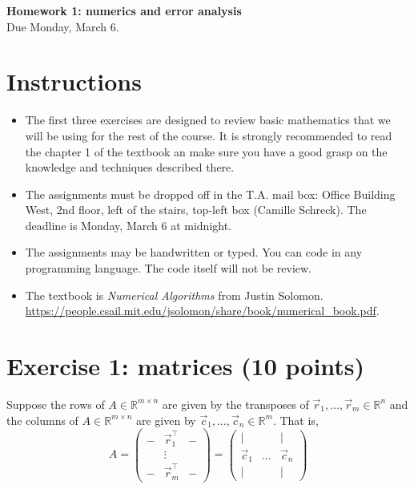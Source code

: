 

\lstset{
  language=Algo,
  basicstyle=\sffamily,
  columns=fullflexible,
  mathescape
}

\begin{center}
{\large\textbf{Homework 1: numerics and error analysis}}\\
Due Monday, March 6.
\end{center}

\noindent\makebox[\linewidth]{\rule{\linewidth}{0.6pt}}
 
\section{Instructions}

\begin{itemize}
\item The first three exercises are designed to review basic mathematics that we will be using for the rest of the course. It is strongly recommended to read the chapter 1 of the textbook an make sure you have a good grasp on the knowledge and techniques described there.
\item The assignments must be dropped off in the T.A. mail box: Office Building West, 2nd floor, left of the stairs, top-left box (Camille Schreck). The deadline is Monday, March 6 at midnight. 
\item The assignments may be handwritten or typed. You can code in any programming language. The code itself will not be review. 
\item The textbook is \emph{Numerical Algorithms} from Justin Solomon.\\ \url{https://people.csail.mit.edu/jsolomon/share/book/numerical_book.pdf}.
\end{itemize}



\noindent\makebox[\linewidth]{\rule{\linewidth}{0.6pt}}

\section{Exercise 1: matrices \normalsize \textnormal(10 points)}

Suppose the rows of $A \in \mathds{R}^{m \times n}$ are given by the transposes of $\vec{r}_1, \hdots , \vec{r}_m \in  \mathds{R}^n$ and
the columns of $A \in \mathds{R}^{m \times n}$ are given by  $\vec{c}_1, \hdots , \vec{c}_n \in  \mathds{R}^m$. That is,
$$ A =
\left(\begin{matrix}
  - & \vec{r}_1^\top & - \\
   & \vdots &  \\
  - & \vec{r}_m^\top & -
\end{matrix} \right) =
\left(\begin{matrix}
  | &  & | \\
 \vec{c}_1 & \hdots &   \vec{c}_n\\
  | &  & |
\end{matrix} \right)
$$

